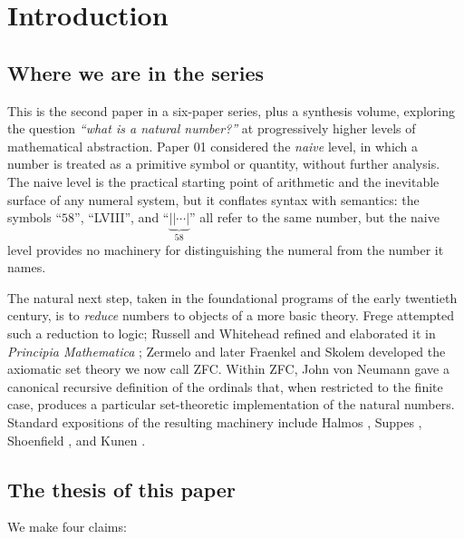 \documentclass[12pt]{article}
\theoremstyle{definition}
\theoremstyle{remark}
\begin{document}
\section{Introduction}
\label{sec:intro}

\subsection{Where we are in the series}

This is the second paper in a six-paper series, plus a synthesis volume,
exploring the question \emph{``what is a natural number?''} at progressively
higher levels of mathematical abstraction. Paper 01 considered the
\emph{naive} level, in which a number is treated as a primitive symbol or
quantity, without further analysis. The naive level is the practical
starting point of arithmetic and the inevitable surface of any numeral
system, but it conflates syntax with semantics: the symbols ``$58$'',
``LVIII'', and ``$\underbrace{\vert\vert\cdots\vert}_{58}$'' all refer to
the same number, but the naive level provides no machinery for distinguishing
the numeral from the number it names.

The natural next step, taken in the foundational programs of the early
twentieth century, is to \emph{reduce} numbers to objects of a more basic
theory. Frege \cite{frege1884} attempted such a reduction to logic; Russell
and Whitehead refined and elaborated it in \emph{Principia Mathematica}
\cite{principia}; Zermelo and later Fraenkel and Skolem developed the
axiomatic set theory we now call ZFC. Within ZFC, John von Neumann
\cite{vonNeumann1923} gave a canonical recursive definition of the ordinals
that, when restricted to the finite case, produces a particular set-theoretic
implementation of the natural numbers. Standard expositions of the resulting
machinery include Halmos \cite{halmos1960}, Suppes \cite{suppes1960},
Shoenfield \cite{shoenfield1967}, and Kunen \cite{kunen1980}.

\subsection{The thesis of this paper}

We make four claims:
\end{document}
